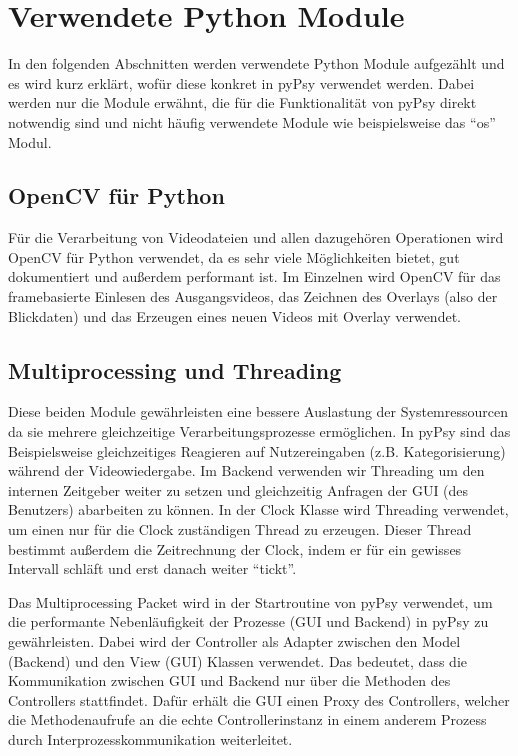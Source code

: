 \documentclass[a4paper,draft]{scrartcl}
\begin{document}
\section{Verwendete Python Module}
In den folgenden Abschnitten werden verwendete Python Module aufgezählt und es wird kurz erklärt, wofür diese konkret in pyPsy verwendet werden. Dabei werden nur die Module erwähnt, die für die Funktionalität von pyPsy direkt notwendig sind und nicht häufig verwendete Module wie beispielsweise das "`os"' Modul. 
\subsection{OpenCV für Python}
Für die Verarbeitung von Videodateien und allen dazugehören Operationen wird OpenCV für Python verwendet, da es sehr viele Möglichkeiten bietet, gut dokumentiert und außerdem performant ist. 
Im Einzelnen wird OpenCV für das framebasierte Einlesen des Ausgangsvideos, das Zeichnen des Overlays (also der Blickdaten) und das Erzeugen eines neuen Videos mit Overlay verwendet.
\subsection{Multiprocessing und Threading}
Diese beiden Module gewährleisten eine bessere Auslastung der Systemressourcen da sie mehrere gleichzeitige Verarbeitungsprozesse erm\"oglichen. In pyPsy sind das Beispielsweise gleichzeitiges Reagieren auf Nutzereingaben (z.B. Kategorisierung) w\"ahrend der Videowiedergabe.
Im Backend verwenden wir Threading um den internen Zeitgeber weiter zu setzen und gleichzeitig Anfragen der GUI (des Benutzers) abarbeiten zu k\"onnen.
In der Clock Klasse wird Threading verwendet, um einen nur für die Clock zuständigen Thread zu erzeugen. Dieser Thread bestimmt außerdem die Zeitrechnung der Clock, indem er für ein gewisses Intervall schläft und erst danach weiter "`tickt"'. 

Das Multiprocessing Packet wird in der Startroutine von pyPsy verwendet, um die performante Nebenl\"aufigkeit der Prozesse (GUI und Backend) in pyPsy zu gew\"ahrleisten. Dabei wird der Controller als Adapter zwischen den Model (Backend) und den View (GUI) Klassen verwendet. Das bedeutet, dass die Kommunikation zwischen GUI und Backend nur \"uber die Methoden des Controllers stattfindet. Daf\"ur erh\"alt die GUI einen Proxy des Controllers, welcher die Methodenaufrufe an die echte Controllerinstanz in einem anderem Prozess durch Interprozesskommunikation weiterleitet.
\end{document}
